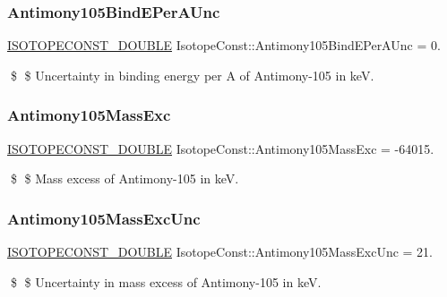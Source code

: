 \subsubsection{\texorpdfstring{Antimony105\+Bind\+E\+Per\+A\+Unc}{Antimony105BindEPerAUnc}}
{\footnotesize\ttfamily \mbox{\hyperlink{group___isotope_const-_macros_ga8f45a7272ce02c0b4c65c44636ed719a}{I\+S\+O\+T\+O\+P\+E\+C\+O\+N\+S\+T\+\_\+\+D\+O\+U\+B\+LE}} Isotope\+Const\+::\+Antimony105\+Bind\+E\+Per\+A\+Unc = 0.}

\$ \$ Uncertainty in binding energy per A of Antimony-\/105 in keV. \mbox{\label{group___isotope_const-_antimony-_sb105_ga7dcc9c0accc257b54d3cc164fd038a78}} 
\subsubsection{\texorpdfstring{Antimony105\+Mass\+Exc}{Antimony105MassExc}}
{\footnotesize\ttfamily \mbox{\hyperlink{group___isotope_const-_macros_ga8f45a7272ce02c0b4c65c44636ed719a}{I\+S\+O\+T\+O\+P\+E\+C\+O\+N\+S\+T\+\_\+\+D\+O\+U\+B\+LE}} Isotope\+Const\+::\+Antimony105\+Mass\+Exc = -\/64015.}

\$ \$ Mass excess of Antimony-\/105 in keV. \mbox{\label{group___isotope_const-_antimony-_sb105_ga8864d2864d81a6bc1c6377340db84212}} 
\subsubsection{\texorpdfstring{Antimony105\+Mass\+Exc\+Unc}{Antimony105MassExcUnc}}
{\footnotesize\ttfamily \mbox{\hyperlink{group___isotope_const-_macros_ga8f45a7272ce02c0b4c65c44636ed719a}{I\+S\+O\+T\+O\+P\+E\+C\+O\+N\+S\+T\+\_\+\+D\+O\+U\+B\+LE}} Isotope\+Const\+::\+Antimony105\+Mass\+Exc\+Unc = 21.}

\$ \$ Uncertainty in mass excess of Antimony-\/105 in keV. \mbox{\label{group___isotope_const-_antimony-_sb105_ga399e0d4afc1338b26f8d7f7d7a691a95}} 
